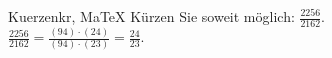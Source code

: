 \begin{MAufgabe}{Kuerzen}{kr, MaTeX}
K\"urzen Sie soweit m\"oglich: $\frac{2256}{2162}$.\\ 
\ifLsg\MLoesung
\quad $\frac{2256}{2162}=\frac{(94)\cdot(24)}{(94)\cdot(23)}=\frac{24}{23}$.\else\relax\fi
 \end{MAufgabe}